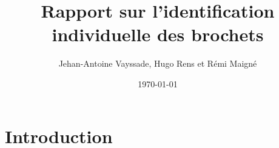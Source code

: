 \documentclass{article}
\title{Rapport sur l'identification individuelle des brochets}
\author{Jehan-Antoine Vayssade, Hugo Rens et Rémi Maigné}
\date{\today}
\begin{document}
\maketitle

\section*{Introduction}
\end{document}
